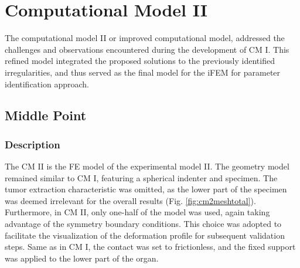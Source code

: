 \section{Computational Model II}
\label{section:cmII}
The computational model II or improved computational model, addressed the challenges and observations 
encountered during the development of CM I. This refined model integrated the proposed
solutions to the previously identified irregularities, and thus served as the final model for the 
iFEM for parameter identification approach. 

\subsection{Middle Point}
\label{subsection:mpcmII}
\subsubsection*{Description}
The CM II is the FE model of the experimental model II. The geometry model remained similar to CM I,
featuring a spherical indenter and specimen. The tumor extraction characteristic was omitted, as the 
lower part of the specimen was deemed irrelevant for the overall results (Fig. \ref{fig:cm2meshtotal}). Furthermore, in CM II, only 
one-half of the model was used, again taking advantage of the symmetry boundary conditions. This choice was adopted to facilitate the visualization of the deformation profile for subsequent validation 
steps. Same as in CM I, the contact was set to frictionless, and the fixed support was applied to the lower part of the organ.\\

